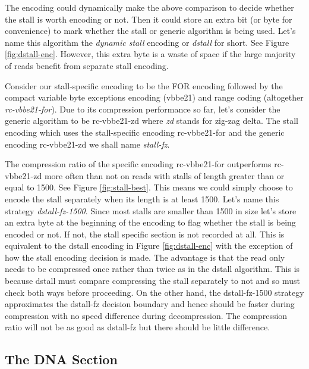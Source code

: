 

The encoding could dynamically make the above comparison to decide
whether the stall is worth encoding or not. Then it could store an extra bit (or
byte for convenience) to mark whether the stall or generic algorithm is being
used. Let's name this algorithm the \textit{dynamic stall} encoding or
\textit{dstall} for short. See Figure \ref{fig:dstall-enc}. However, this extra
byte is a waste of space if the large majority of reads benefit from separate
stall encoding.



Consider our stall-specific encoding to be the FOR encoding followed by the
compact variable byte exceptions encoding (vbbe21) and range coding (altogether
\textit{rc-vbbe21-for}). Due to its compression performance so far, let's
consider the generic algorithm to be rc-vbbe21-zd where \textit{zd} stands for
zig-zag delta. The stall encoding which uses the stall-specific encoding
rc-vbbe21-for and the generic encoding rc-vbbe21-zd we shall name
\textit{stall-fz}.

The compression ratio of the specific encoding rc-vbbe21-for outperforms
rc-vbbe21-zd more often than not on reads with stalls of length greater than or
equal to 1500. See Figure \ref{fig:stall-best}. This means we could simply
choose to encode the stall separately when its length is at least 1500. Let's
name this strategy \textit{dstall-fz-1500}. Since most stalls are smaller than
1500 in size let's store an extra byte at the beginning of the encoding to flag
whether the stall is being encoded or not. If not, the stall specific section is
not recorded at all. This is equivalent to the dstall encoding in Figure
\ref{fig:dstall-enc} with the exception of how the stall encoding decision is
made. The advantage is that the read only needs to be compressed once rather
than twice as in the dstall algorithm. This is because dstall must compare
compressing the stall separately to not and so must check both ways before
proceeding. On the other hand, the dstall-fz-1500 strategy approximates the
dstall-fz decision boundary and hence should be faster during compression with
no speed difference during decompression. The compression ratio will not be as
good as dstall-fz but there should be little difference.

%


\subsection{The DNA Section}

